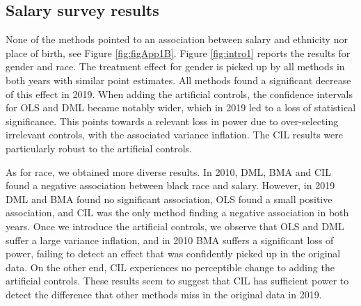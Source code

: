 \documentclass[12pt]{article}
\begin{document}
\subsection{Salary survey results}
\label{sec:cps_results}


None of the methods pointed to an association between salary and ethnicity nor place of birth, see Figure \ref{fig:figApp1B}. Figure \ref{fig:intro1} reports the results for gender and race. The treatment effect for gender is picked up by all methods in both years with similar point estimates. All methods found a significant decrease of this effect in 2019. 
When adding the artificial controls, the confidence intervals for OLS and DML became notably wider, which in 2019 led to a loss of statistical significance. This points towards a relevant loss in power due to over-selecting irrelevant controls, with the associated variance inflation.
The CIL results were particularly robust to the artificial controls.

As for race, we obtained more diverse results. In 2010, DML, BMA and CIL found a negative association between black race and salary. However, in 2019 DML and BMA found no significant association, OLS found a small positive association, and CIL was the only method finding a negative association in both years.
Once we introduce the artificial controls, we observe that OLS and DML suffer a large variance inflation, and in 2010 BMA suffers a significant loss of power, failing to detect an effect that was confidently picked up in the original data. 
On the other end, CIL experiences no perceptible change to adding the artificial controls. These results seem to suggest that CIL has sufficient power to detect the difference that other methods miss in the original data in 2019. 
\end{document}
